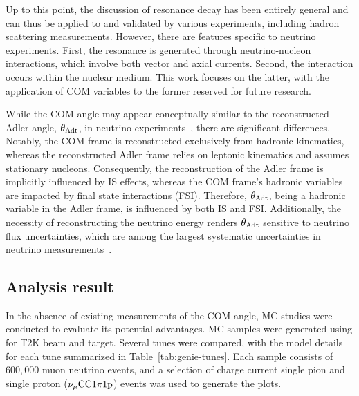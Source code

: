 Up to this point, the discussion of resonance decay has been entirely general and can thus be applied to and validated by various experiments, including hadron scattering measurements. 
However, there are features specific to neutrino experiments. 
First, the resonance is generated through neutrino-nucleon interactions, which involve both vector and axial currents. 
Second, the interaction occurs within the nuclear medium. 
This work focuses on the latter, with the application of COM variables to the former reserved for future research.

While the COM angle may appear conceptually similar to the reconstructed Adler angle, $\theta_{\textrm{Adt}}$, in neutrino experiments~\cite{Sanchez:2015yvw}, there are significant differences. 
Notably, the COM frame is reconstructed exclusively from hadronic kinematics, whereas the reconstructed Adler frame relies on leptonic kinematics and assumes stationary nucleons. 
Consequently, the reconstruction of the Adler frame is implicitly influenced by IS effects, whereas the COM frame's hadronic variables are impacted by final state interactions (FSI). 
Therefore, $\theta_{\textrm{Adt}}$, being a hadronic variable in the Adler frame, is influenced by both IS and FSI. 
Additionally, the necessity of reconstructing the neutrino energy renders $\theta_{\textrm{Adt}}$ sensitive to neutrino flux uncertainties, which are among the largest systematic uncertainties in neutrino measurements~\cite{T2K:2019yqu,T2K:2021naz,MicroBooNECollaboration:2024gvg,NOvA:2023uxq,MINERvA:2022djk}.


     \subsection{Analysis result}
     \label{sec:com-ana}
     In the absence of existing measurements of the COM angle, MC studies were conducted to evaluate its potential advantages.
     MC samples were generated using \genie \cite{Andreopoulos:2009rq, GENIE:2021npt} for T2K beam and target. 
     Several \genie tunes were compared, with the model details for each tune summarized in Table~\ref{tab:genie-tunes}. 
     Each sample consists of $600,000$ muon neutrino events, and a selection of charge current single pion and single proton ($\nu_{\mu}\textrm{CC}1\pi1\textrm{p}$) events was used to generate the plots.

